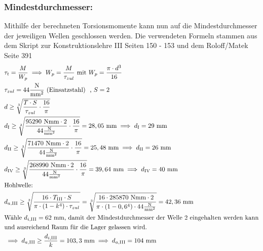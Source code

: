 \subsubsection{Mindestdurchmesser:}
Mithilfe der berechneten Torsionsmomente kann nun auf die Mindestdurchmesser der jeweiligen Wellen geschlossen werden. Die verwendeten Formeln stammen aus dem Skript zur Konstruktionslehre III Seiten 150 - 153 und dem Roloff/Matek Seite 391
\begin{align*}
	&\tau_t = \frac{M}{W_p} \implies W_p = \frac{M}{\tau_{zul}} \text{ mit } W_p = \frac{\pi\cdot d^3}{16} \\
	&\tau_{zul} = 44 \frac{\text{N}}{\text{mm}^2} \text{ (Einsatzstahl) } \text{ , } S= 2 \\
	&d \ge \sqrt[3]{ \frac{T \cdot S}{\tau_{zul}} \cdot \frac{16}{\pi}}  \\
	&d_\mathrm{I} \ge \sqrt[3]{ \frac{95290\text{ Nmm} \cdot 2}{44\frac{\text{N}}{\text{mm}^2}} \cdot \frac{16}{\pi}} = 28,05\text{ mm} \implies d_\mathrm{I} = 29\text{ mm} \\
	&d_\mathrm{II} \ge \sqrt[3]{ \frac{71470\text{ Nmm} \cdot 2}{44\frac{\text{N}}{\text{mm}^2}} \cdot \frac{16}{\pi}} = 25,48\text{ mm} \implies d_\mathrm{II} = 26\text{ mm} \\
	&d_\mathrm{IV} \ge \sqrt[3]{ \frac{268990\text{ Nmm} \cdot 2}{44\frac{\text{N}}{\text{mm}^2}} \cdot \frac{16}{\pi}} = 39,64\text{ mm} \implies d_\mathrm{IV} = 40\text{ mm} \\
	&\text{Hohlwelle: } \\
	&d_{a,\mathrm{III}} \ge \sqrt[3]{ \frac{16 \cdot T_{\mathrm{III}} \cdot S}{\pi \cdot (1-k^4) \cdot \tau_{zul}}} = \sqrt[3]{ \frac{16 \cdot 285870\text{ Nmm} \cdot 2}{\pi \cdot (1-0,6^4) \cdot 44 \frac{\text{N}}{\text{mm}^2} }} = 42,36\text{ mm}  \\
	&\text{Wähle }d_{i,\mathrm{III}} =62  \text{ mm} \text{, damit der Mindestdurchmesser der Welle 2 eingehalten werden kann} \\
	&\text{und ausreichend Raum für die Lager gelassen wird.}\\
	&\implies d_{a,\mathrm{III}} \ge  \frac{d_{i,\mathrm{III}}}{k} = 103,3\text{ mm} \implies d_{a,\mathrm{III}} = 104 \text{ mm}\\
\end{align*}
\newpage
